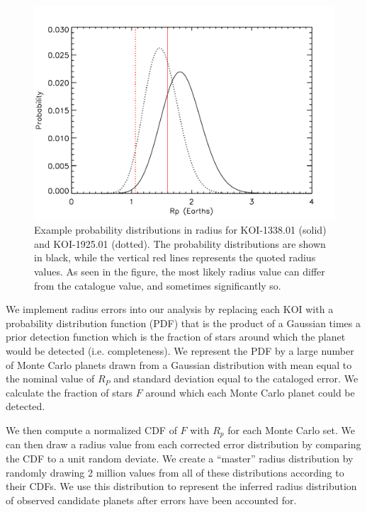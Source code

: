 \begin{figure}[h]
\centerline{\includegraphics[scale=0.55]{chap2/prob_dist.pdf}}
\caption{Example probability distributions in radius for KOI-1338.01 (solid) and 
	KOI-1925.01 (dotted). The probability distributions are shown in black, 
	while the vertical red lines represents the quoted radius 
	values. As seen in the figure, the most likely radius value can 
	differ from the catalogue value, and sometimes significantly so.}
\label{fig:prob}
\end{figure}

We implement radius errors into our analysis by replacing each KOI with a probability
distribution function (PDF) that is the product of a Gaussian times a
prior detection function which is the fraction of stars around which
the planet would be detected (i.e. completeness). We represent the 
PDF by a large number of Monte Carlo planets drawn from a Gaussian 
distribution with mean equal to the nominal value of $R_P$ and 
standard deviation equal to the cataloged error. We calculate the 
fraction of stars $F$ around which each
Monte Carlo planet could be detected.  

We then compute a normalized
CDF of $F$ with $R_p$ for each Monte Carlo set.  We can then draw a
radius value from each corrected error distribution by comparing the
CDF to a unit random deviate.  We create a ``master'' radius
distribution by randomly drawing 2 million values from all of these
distributions according to their CDFs.  We use this distribution to
represent the inferred radius distribution of observed candidate
planets after errors have been accounted for.


